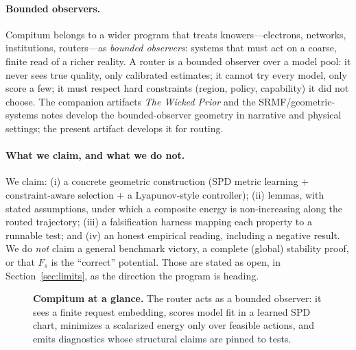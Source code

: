 \documentclass[11pt]{article}
\theoremstyle{plain}
\theoremstyle{definition}
\theoremstyle{remark}
\newcommand{\Fs}{F_{s}}
\begin{document}
\paragraph{Bounded observers.} Compitum belongs to a wider program that treats
knowers---electrons, networks, institutions, routers---as \emph{bounded observers}: systems
that must act on a coarse, finite read of a richer reality. A router is a bounded observer
over a model pool: it never sees true quality, only calibrated estimates; it cannot try
every model, only score a few; it must respect hard constraints (region, policy,
capability) it did not choose. The companion artifacts \emph{The Wicked Prior}
\cite{tiffany2025wicked} and the SRMF/geometric-systems notes develop the bounded-observer
geometry in narrative and physical settings; the present artifact develops it for routing.

\paragraph{What we claim, and what we do not.} We claim: (i) a concrete geometric
construction (SPD metric learning + constraint-aware selection + a Lyapunov-style
controller); (ii) lemmas, with stated assumptions, under which a composite energy is
non-increasing along the routed trajectory; (iii) a falsification harness mapping each
property to a runnable test; and (iv) an honest empirical reading, including a negative
result. We do \emph{not} claim a general benchmark victory, a complete (global) stability
proof, or that $\Fs$ is the ``correct'' potential. Those are stated as open, in
Section~\ref{sec:limits}, as the direction the program is heading.

\begin{figure}[t]
\centering
{}
\caption{\textbf{Compitum at a glance.} The router acts as a bounded observer: it sees a
finite request embedding, scores model fit in a learned SPD chart, minimizes a scalarized
energy only over feasible actions, and emits diagnostics whose structural claims are pinned
to tests.}
\label{fig:roadmap}
\end{figure}
\end{document}
